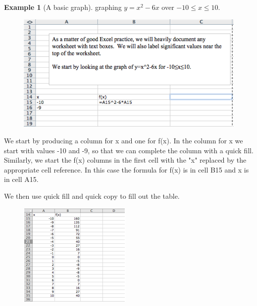 \documentclass[10pt,]{book}
\theoremstyle{plain}
\theoremstyle{definition}
\newtheorem{example}[theorem]{Example}
\theoremstyle{definition}
\begin{document}
\begin{example}[A basic graph]\label{example-5}
 graphing \(y=x^2-6 x\) over \(-10 \le x \le 10\).%
\leavevmode%
\begin{figure}
\centering
\includegraphics[width=0.8\linewidth]{images/sec1-4-1.png}
\end{figure}
\par

We start by producing a column for x and one for f(x).  In the column for x we start with values -10 and -9, so that we can complete the column with a quick fill.  Similarly, we start the f(x) columns in the first cell with the "x" replaced by the appropriate cell reference.  In this case the formula for f(x) is in cell B15 and x is in cell A15.%
\par

We then use quick fill and quick copy to fill out the table.%
\leavevmode%
\begin{figure}
\centering
\includegraphics[width=0.6\linewidth]{images/sec1-4-2.png}
\end{figure}
\par


\end{example}
\end{document}

